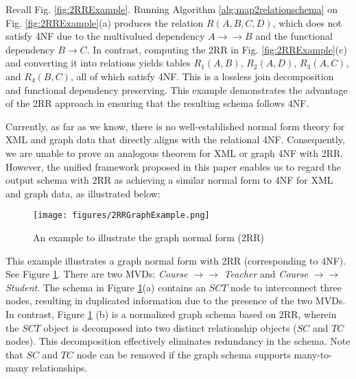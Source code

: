 \begin{example}
Recall Fig. \ref{fig:2RRExample}. Running Algorithm \ref{alg:map2relationschema} on Fig. \ref{fig:2RRExample}(a) produces the relation \( R(A, B, C, D) \), which does not satisfy 4NF due to the multivalued dependency \( A \to\to B \) and the functional dependency \( B \to C \). In contrast, computing the 2RR in Fig. \ref{fig:2RRExample}(c) and converting it into relations yields tables \( R_1(A, B) \), \( R_2(A, D) \), \( R_3(A, C) \), and \( R_4(B, C) \), all of which satisfy 4NF. This is a lossless join decomposition and functional dependency preserving.  This example demonstrates the advantage of the 2RR approach in ensuring that the resulting schema follows 4NF. \end{example}



Currently, as far as we know, there is no well-established normal form theory for XML and graph data that directly aligns with the relational 4NF. Consequently, we are unable to prove an analogous theorem for XML or graph 4NF with 2RR. However, the unified framework proposed in this paper enables us to regard the output schema with 2RR as achieving a similar normal form to 4NF for XML and graph data, as illustrated below:

\begin{figure}
\centering
\texttt{[image: figures/2RRGraphExample.png]}
\caption{An example to illustrate the graph normal form (2RR)} \label{fig:GraphExample2RR}
\end{figure}

\begin{example} This example illustrates a graph normal form with 2RR (corresponding to 4NF). See Figure \ref{fig:GraphExample2RR}. There are two MVDs: \textit{Course} $\to\to$ \textit{Teacher} and \textit{Course} $\to\to$ \textit{Student}. The schema in Figure \ref{fig:GraphExample2RR}(a) contains an $SCT$ node to interconnect three nodes, resulting in duplicated information due to the presence of the two MVDs. In contrast, Figure \ref{fig:GraphExample2RR} (b) is a normalized graph schema based on 2RR, wherein the $SCT$ object is decomposed into two distinct relationship objects ($SC$ and $TC$ nodes). This decomposition effectively eliminates redundancy in the schema. Note that $SC$ and $TC$ node can be removed if the graph schema  supports many-to-many relationships.
\end{example}
